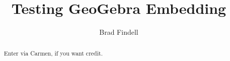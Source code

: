 \documentclass[handout,space,nooutcomes]{xourse}
\title{Testing GeoGebra Embedding}
\author{Brad Findell}
\begin{document}
\begin{abstract}
Enter via Carmen, if you want credit.  
\end{abstract}
\maketitle

{}
\end{document}
